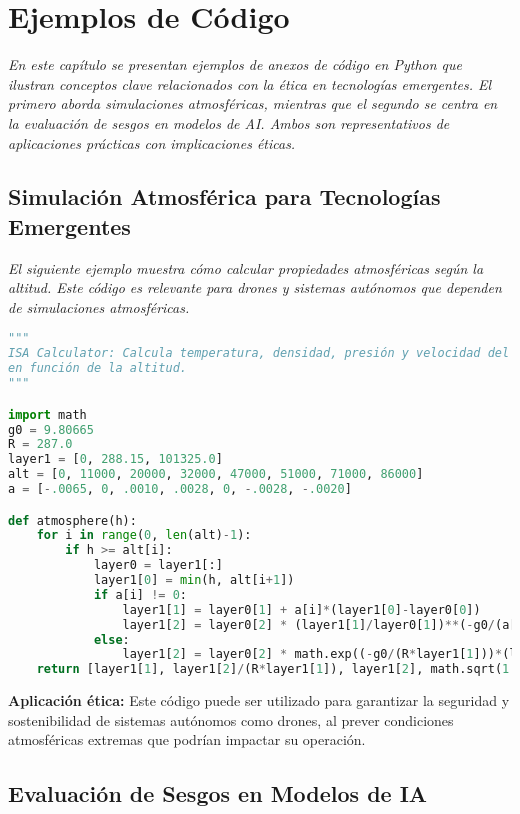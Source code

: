\chapter{Ejemplos de Código}

\emph{En este capítulo se presentan ejemplos de anexos de código en Python que ilustran conceptos clave relacionados con la ética en tecnologías emergentes. El primero aborda simulaciones atmosféricas, mientras que el segundo se centra en la evaluación de sesgos en modelos de AI. Ambos son representativos de aplicaciones prácticas con implicaciones éticas.}

\section{Simulación Atmosférica para Tecnologías Emergentes}

\emph{El siguiente ejemplo muestra cómo calcular propiedades atmosféricas según la altitud. Este código es relevante para drones y sistemas autónomos que dependen de simulaciones atmosféricas.}

\begin{lstlisting}[language=Python, caption={Cálculo de propiedades atmosféricas basado en ISA}, label={lst:atmosfera}]
"""
ISA Calculator: Calcula temperatura, densidad, presión y velocidad del sonido
en función de la altitud.
"""

import math
g0 = 9.80665
R = 287.0
layer1 = [0, 288.15, 101325.0]
alt = [0, 11000, 20000, 32000, 47000, 51000, 71000, 86000]
a = [-.0065, 0, .0010, .0028, 0, -.0028, -.0020]

def atmosphere(h):
    for i in range(0, len(alt)-1):
        if h >= alt[i]:
            layer0 = layer1[:]
            layer1[0] = min(h, alt[i+1])
            if a[i] != 0:
                layer1[1] = layer0[1] + a[i]*(layer1[0]-layer0[0])
                layer1[2] = layer0[2] * (layer1[1]/layer0[1])**(-g0/(a[i]*R))
            else:
                layer1[2] = layer0[2] * math.exp((-g0/(R*layer1[1]))*(layer1[0]-layer0[0]))
    return [layer1[1], layer1[2]/(R*layer1[1]), layer1[2], math.sqrt(1.4*R*layer1[1])]
\end{lstlisting}

\textbf{Aplicación ética:} Este código puede ser utilizado para garantizar la seguridad y sostenibilidad de sistemas autónomos como drones, al prever condiciones atmosféricas extremas que podrían impactar su operación.

\section{Evaluación de Sesgos en Modelos de IA}


